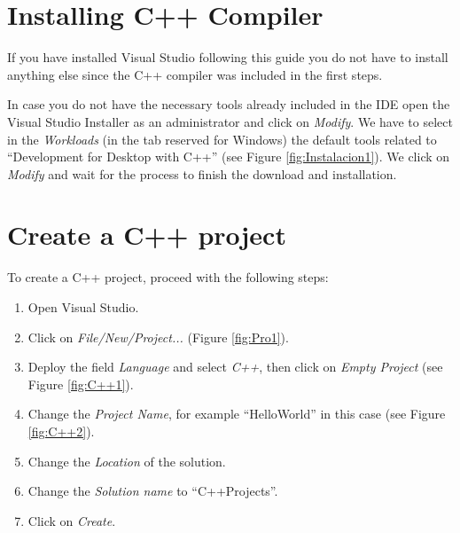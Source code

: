	


    \FloatBarrier
    \section{Installing C++ Compiler}

If you have installed Visual Studio following this guide you do not have to install anything else since the C++ compiler was included in the first steps. 

In case you do not have the necessary tools already included in the IDE open the Visual Studio Installer as an administrator and click on \textit{Modify}. We have to select in the \textit{Workloads} (in the tab reserved for Windows) the default tools related to ``Development for Desktop with C++'' (see Figure \ref{fig:Instalacion1}). We click on \textit{Modify} and wait for the process to finish the download and installation. 



    \FloatBarrier
    \section{Create a C++ project}

To create a C++ project, proceed with the following steps: 

\begin{enumerate}
    \item Open Visual Studio.
    \item Click on \textit{File/New/Project...} (Figure \ref{fig:Pro1}).
    \item Deploy the field \textit{Language} and select \textit{C++}, then click on \textit{Empty Project} (see Figure \ref{fig:C++1}).
    \item Change the \textit{Project Name}, for example ``HelloWorld'' in this case (see Figure \ref{fig:C++2}). 
    \item Change the \textit{Location} of the solution.
    \item Change the \textit{Solution name} to ``C++Projects''.  
    \item Click on \textit{Create}.
\end{enumerate}

